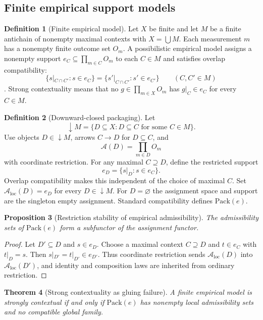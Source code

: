 \documentclass[11pt]{article}
\theoremstyle{plain}
\newtheorem{theorem}{Theorem}[section]
\newtheorem{proposition}[theorem]{Proposition}
\theoremstyle{definition}
\newtheorem{definition}[theorem]{Definition}
\theoremstyle{remark}
\newcommand{\LocalAdm}{\mathcal{A}_{\mathrm{loc}}}
\begin{document}
\subsection{Finite empirical support models}

\begin{definition}[Finite empirical model]\label{def:empirical}
Let $X$ be finite and let $M$ be a finite antichain of nonempty maximal
contexts with $X=\bigcup M$. Each measurement $m$ has a nonempty finite outcome set $O_m$.
A possibilistic empirical model assigns a nonempty support
$e_C\subseteq\prod_{m\in C}O_m$ to each $C\in M$ and satisfies overlap
compatibility:
\[
\{s|_{C\cap C'}:s\in e_C\}
=
\{s'|_{C\cap C'}:s'\in e_{C'}\}
\qquad(C,C'\in M)
\]
\cite{abramsky}. Strong contextuality means that no
$g\in\prod_{m\in X}O_m$ has $g|_C\in e_C$ for every $C\in M$.
\end{definition}

\begin{definition}[Downward-closed packaging]\label{def:packaging}
Let
\[
\downarrow M=\{D\subseteq X:D\subseteq C\text{ for some }C\in M\}.
\]
Use objects $D\in\downarrow M$, arrows $C\to D$ for $D\subseteq C$, and
\[
\mathcal A(D)=\prod_{m\in D}O_m
\]
with coordinate restriction. For any maximal $C\supseteq D$, define the
restricted support
\[
e_D=\{s|_D:s\in e_C\}.
\]
Overlap compatibility makes this independent of the choice of maximal $C$.
Set $\LocalAdm(D)=e_D$ for every $D\in\downarrow M$. For $D=\varnothing$ the
assignment space and support are the singleton empty assignment. Standard
compatibility defines $\mathrm{Pack}(e)$.
\end{definition}

\begin{proposition}[Restriction stability of empirical admissibility]\label{prop:empirical-subfunctor}
The admissibility sets of $\mathrm{Pack}(e)$ form a subfunctor of the assignment
functor.
\end{proposition}

\begin{proof}
Let $D'\subseteq D$ and $s\in e_D$. Choose a maximal context $C\supseteq D$ and
$t\in e_C$ with $t|_D=s$. Then
$s|_{D'}=t|_{D'}\in e_{D'}$. Thus coordinate restriction sends
$\LocalAdm(D)$ into $\LocalAdm(D')$, and identity and composition laws are
inherited from ordinary restriction.
\end{proof}

\begin{theorem}[Strong contextuality as gluing failure]\label{thm:KSfin}
A finite empirical model is strongly contextual if and only if
$\mathrm{Pack}(e)$ has nonempty local admissibility sets and no compatible
global family.
\end{theorem}
\end{document}
